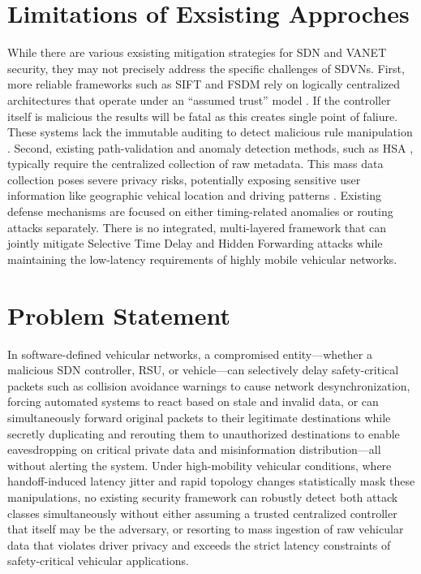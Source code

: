 \documentclass[12pt, a4paper]{report}
\begin{document}
\section{Limitations of Exsisting Approches}
While there are various exsisting  mitigation strategies for SDN and VANET security, they may not precisely address the specific challenges of SDVNs. First, more reliable frameworks such as SIFT \cite{pascoal2017slow} and FSDM \cite{9356082} rely on logically centralized architectures that operate under an ``assumed trust'' model \cite{electronics12143077}. If the controller itself is malicious the results will be fatal as this creates single point of faliure. These systems lack the immutable auditing to detect malicious rule manipulation \cite{jaballah2019survey}. Second, existing path-validation and anomaly detection methods, such as HSA \cite{mohammadi2016detecting}, typically require the centralized collection of raw metadata. This mass data collection poses severe privacy risks, potentially exposing sensitive user information like geographic vehical location and driving patterns \cite{11059879}. Existing defense mechanisms are focused on either timing-related anomalies or routing attacks separately. There is no integrated, multi-layered framework that can jointly mitigate Selective Time Delay and Hidden Forwarding attacks while maintaining the low-latency requirements of highly mobile vehicular networks.

\section{Problem Statement}

In software-defined vehicular networks, a compromised entity---whether a
malicious SDN controller, RSU, or vehicle---can selectively delay
safety-critical packets such as collision avoidance warnings to cause
network desynchronization, forcing automated systems to react based on
stale and invalid data, or can simultaneously forward original packets
to their legitimate destinations while secretly duplicating and rerouting
them to unauthorized destinations to enable eavesdropping on critical
private data and misinformation distribution---all without alerting the
system. Under high-mobility vehicular conditions, where handoff-induced
latency jitter and rapid topology changes statistically mask these
manipulations, no existing security framework can robustly detect both
attack classes simultaneously without either assuming a trusted
centralized controller that itself may be the adversary, or resorting
to mass ingestion of raw vehicular data that violates driver privacy
and exceeds the strict latency constraints of safety-critical
vehicular applications.
\end{document}
